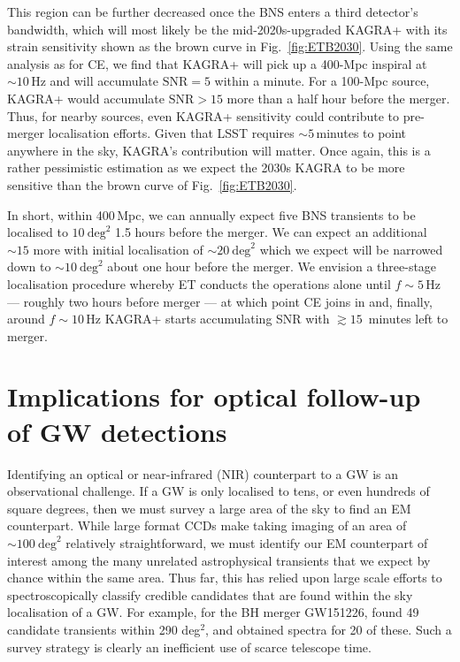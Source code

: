 \documentclass{aa}
\begin{document}
This region can be further decreased once the BNS enters a third detector's bandwidth,
which will most likely be the mid-2020s-upgraded KAGRA+ with its strain sensitivity shown as the brown curve in Fig.~\ref{fig:ETB2030}.
Using the same analysis as for CE, we find that KAGRA+ will pick up a 400-Mpc inspiral at $\sim 10\,$Hz and will accumulate $\text{SNR}=5$ within a minute. 
For a 100-Mpc source, KAGRA+ would accumulate $\text{SNR} > 15$ more than a half hour before the merger.
Thus, for nearby sources, even KAGRA+ sensitivity could contribute to pre-merger localisation efforts. Given that LSST requires $\sim 5\,$minutes to
point anywhere in the sky, KAGRA's contribution will matter.
Once again, this is a rather pessimistic estimation as we expect the 2030s KAGRA
to be more sensitive than the brown curve of Fig.~\ref{fig:ETB2030}.

In short, within 400\,Mpc, we can annually expect five BNS transients to be localised to $10~\mathrm{deg}^2$ 1.5 hours
before the merger. We can expect an additional $\sim15$ more with initial localisation of $\sim 20~\mathrm{deg}^2$ 
which we expect will be narrowed down to $\sim10~\mathrm{deg}^2$ about one hour before the merger.
We envision a three-stage localisation procedure whereby ET conducts the operations alone until $f\sim 5\,$Hz 
--- roughly two hours before merger --- at which point CE joins in and, finally, around $f\sim 10\,$Hz KAGRA+ starts accumulating SNR with $\gtrsim 15\,$ minutes left to merger.

\section{Implications for optical follow-up of GW detections} \label{sect:EM}
Identifying an optical or near-infrared (NIR) counterpart to a GW is an observational challenge. If a GW is only localised to tens, or even hundreds of square degrees, then we must survey a large area of the sky to find an EM counterpart. While large format CCDs make taking imaging of an area of $\sim100~\mathrm{deg}^2$ relatively straightforward, we must identify our EM counterpart of interest among the many unrelated astrophysical transients that we expect by chance within the same area. Thus far, this has relied upon large scale efforts to spectroscopically classify credible candidates that are found within the sky localisation of a GW. For example, for the BH merger GW151226, \cite{Smar16} found 49 candidate transients within 290 deg$^2$, and obtained spectra for 20 of these. Such a survey strategy is clearly an inefficient use of scarce telescope time.
\end{document}
